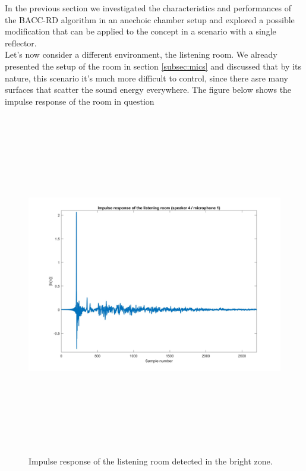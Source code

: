 In the previous section we investigated the characteristics and performances of the BACC-RD algorithm in an anechoic chamber setup and explored a possible modification that can be applied to the concept in a scenario with a single reflector.
\\
Let's now consider a different environment, the listening room. We already presented the setup of the room in section \ref{subsec:mics} and discussed that by its nature, this scenario it's much more difficult to control, since there asre many surfaces that scatter the sound energy everywhere.
The figure below shows the impulse response of the room in question

\begin{figure}[H]
\centering
\includegraphics[width=15cm,height=15cm,keepaspectratio]
{Figures/irlisteningroom}
\caption[IR listening room]{Impulse response of the listening room detected in the bright zone.}
\label{fig:irlisteningroom}
\end{figure}

